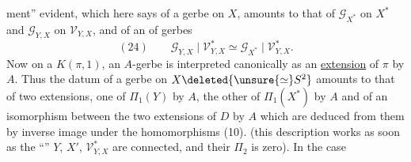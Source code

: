 ment'' evident, which here says 
of a gerbe 
on $X$, amounts to that of  $\mathcal G_{X^*}$ on
$X^*$ and $\mathcal G_{Y,X}$ on $\mathcal V_{Y,X}$, and of an
 of  gerbes
\[
(24)\qquad \mathcal G_{Y,X}\mid\mathcal V^*_{Y,X}\simeq
\mathcal G_{X^*}\mid\mathcal V^*_{Y,X}.
\]
Now on a $K(\pi,1)$, an $A$-gerbe
is interpreted canonically as an
\uline{extension} of $\pi$ by $A$. Thus the datum
of a gerbe on $X\deleted{{}\unsure{\simeq} S^2}$\unsure{,} amounts to that
of  two extensions, one of
$\Pi_1(Y)$ by $A$, the other of $\Pi_1(X^*)$ by $A$
and of an isomorphism between the two extensions
of $D$ by $A$ which are deduced from them\unsure{,}
by inverse image under the homomorphisms (10).
(this description works as soon as the
``'' $Y$, $X'$, $\mathcal V^*_{Y,X}$ are connected, and
their $\Pi_2$ is zero). In the case
